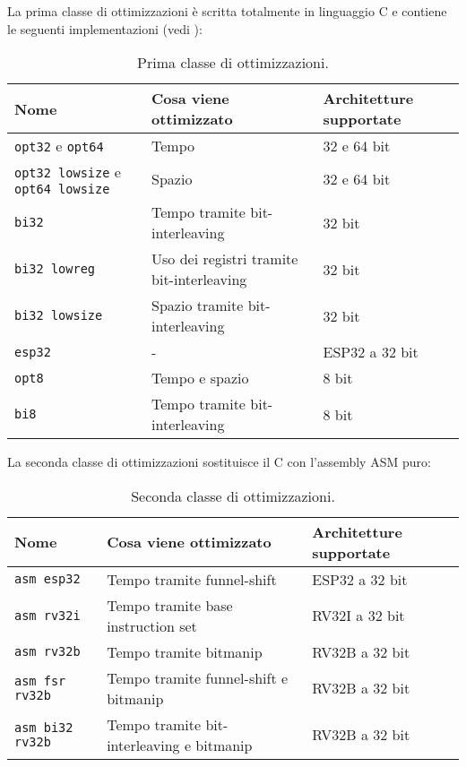 \noindent La prima classe di ottimizzazioni è scritta totalmente in linguaggio C e contiene le seguenti implementazioni\cite{github} (vedi ):
\begin{table}[H]
    \centering
	\begin{tabular}{|m{}<{\centering}||m{}<{\centering}|m{}<{\centering}|}
		\hline
        \textbf{Nome} & \textbf{Cosa viene ottimizzato} & \textbf{Architetture supportate} \\
		\hline \hline
        \texttt{opt32} e \texttt{opt64} & Tempo & 32 e 64 bit \\
        \hline
        \texttt{opt32 lowsize} e \texttt{opt64 lowsize} & Spazio & 32 e 64 bit \\
        \hline
        \texttt{bi32} & Tempo tramite bit-interleaving & 32 bit \\
        \hline
        \texttt{bi32 lowreg} & Uso dei registri tramite bit-interleaving & 32 bit \\
        \hline
        \texttt{bi32 lowsize} & Spazio tramite bit-interleaving & 32 bit \\
        \hline
        \texttt{esp32} & - & ESP32 a 32 bit \\
        \hline
        \texttt{opt8} & Tempo e spazio & 8 bit \\
        \hline
        \texttt{bi8} & Tempo tramite bit-interleaving & 8 bit \\
        \hline
    \end{tabular}
    \caption{Prima classe di ottimizzazioni.}
    \label{tab: prima_classe_ottimizzazioni}
\end{table}

\noindent La seconda classe di ottimizzazioni sostituisce il C con l'assembly ASM puro\cite{github}:
\begin{table}[H]
    \centering
	\begin{tabular}{|m{}<{\centering}||m{}<{\centering}|m{}<{\centering}|}
		\hline
		\textbf{Nome} & \textbf{Cosa viene ottimizzato} & \textbf{Architetture supportate} \\
        \hline \hline
        \texttt{asm esp32} & Tempo tramite funnel-shift & ESP32 a 32 bit \\
        \hline
        \texttt{asm rv32i} & Tempo tramite base instruction set & RV32I a 32 bit \\
        \hline
        \texttt{asm rv32b} & Tempo tramite bitmanip & RV32B a 32 bit \\
        \hline
        \texttt{asm fsr rv32b} & Tempo tramite funnel-shift e bitmanip & RV32B a 32 bit \\
        \hline
        \texttt{asm bi32 rv32b} & Tempo tramite bit-interleaving e bitmanip & RV32B a 32 bit \\
        \hline
    \end{tabular}
    \caption{Seconda classe di ottimizzazioni.}
\end{table}

